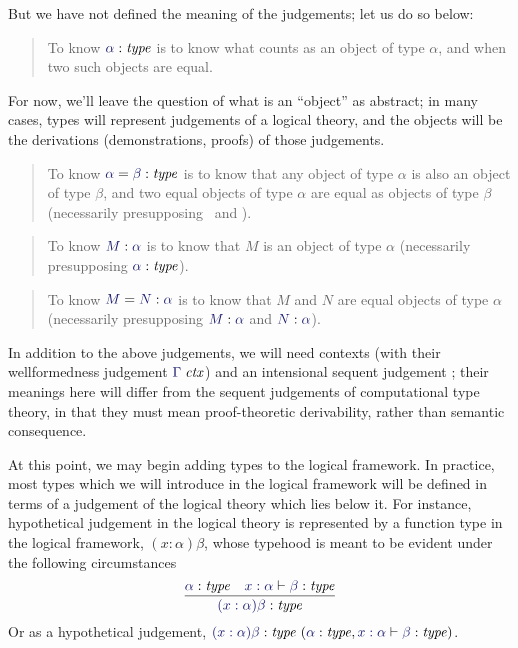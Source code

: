 But we have not defined the meaning of the judgements; let us do so below:

\begin{quote}
  To know $\type\alpha$ is to know what counts as an object of type $\alpha$,
  and when two such objects are equal.
\end{quote}

For now, we'll leave the question of what is an ``object'' as
abstract; in many cases, types will represent judgements of a logical
theory, and the objects will be the derivations (demonstrations,
proofs) of those judgements.

\begin{quote}
  To know $\etype{\alpha}{\beta}$ is to know that any object of type $\alpha$ is
  also an object of type $\beta$, and two equal objects of type $\alpha$ are
  equal as objects of type $\beta$ (necessarily presupposing \type\alpha\ and
  \type\beta).
\end{quote}

\begin{quote}
  To know $\ofty{M}{\alpha}$ is to know that $M$ is an object of type $\alpha$
  (necessarily presupposing $\type\alpha$).
\end{quote}

\begin{quote}
  To know $\eofty{M}{N}{\alpha}$ is to know that $M$ and $N$ are equal objects of type
  $\alpha$ (necessarily presupposing $\ofty{M}{\alpha}$ and $\ofty{N}{\alpha}$).
\end{quote}

In addition to the above judgements, we will need contexts (with their
wellformedness judgement $\isctx{\Gamma}$) and an intensional sequent judgement
; their meanings here will differ
from the sequent judgements of computational type theory, in that they must
mean proof-theoretic derivability, rather than semantic consequence.

At this point, we may begin adding types to the logical framework. In
practice, most types which we will introduce in the logical framework
will be defined in terms of a judgement of the logical theory which
lies below it.  For instance, hypothetical judgement in the logical
theory is represented by a function type in the logical framework,
$(x:\alpha)\beta$, whose typehood is meant to be evident under the
following circumstances
\[
  \infer{
    \type{(x:\alpha)\beta}
  }{
    \type\alpha &
    \lfsequent{x:\alpha}{\type\beta}
  }
\]
Or as a hypothetical judgement,
$\hyp{\type{(x:\alpha)\beta}}{\type\alpha,\lfsequent{x:\alpha}{\type\beta}}$.

